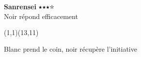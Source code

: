 \documentclass[preview, border=0pt, varwidth=false]{standalone}
\begin{document}
	\setgounit{0.6cm} 
	
\parbox[c][14.65cm][c]{10.2cm}{
	\centering
	
	{\Large\textbf{Sanrensei} $\medblackstar \medblackstar \medblackstar \medwhitestar$ \\ Noir répond efficacement}
	\vspace{3em}
	
	\begin{psgopartialboard}{(1,1)(13,11)}
		\pass
	\end{psgopartialboard}
	
	\vspace{1em}
	Blanc prend le coin, noir récupère l'initiative
}
\end{document}
